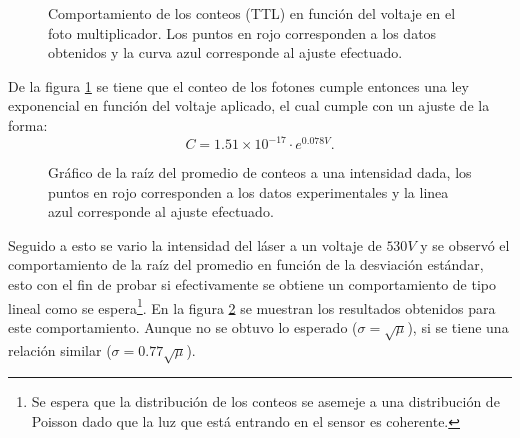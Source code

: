 \documentclass[%
 reprint,
 amsmath,amssymb,
 aps,
]{revtex4-1}
\begin{document}
{\begin{figure}[ht]
\caption{\label{fotomultiplicador}Comportamiento de los conteos (TTL) en función del voltaje en el foto multiplicador. Los puntos en rojo corresponden a los datos obtenidos y la curva azul corresponde al ajuste efectuado.}
\end{figure}

De la figura \ref{fotomultiplicador} se tiene que el conteo de los fotones cumple entonces una ley exponencial en función del voltaje aplicado, el cual cumple con un ajuste de la forma:
\begin{equation}
C=1.51\times10^{-17}\cdot e^{0.078V}.
\end{equation}

\begin{figure}[h]
\caption{\label{promedios_std} Gráfico de la raíz del promedio de conteos a una intensidad dada, los puntos en rojo corresponden a los datos experimentales y la linea azul corresponde al ajuste efectuado.}
\end{figure}

Seguido a esto se vario la intensidad del láser a un voltaje de $530 V$ y se observó el comportamiento de la raíz del promedio en función de la desviación estándar, esto con el fin de probar si efectivamente se obtiene un comportamiento de tipo lineal como se espera\footnote{Se espera que la distribución de los conteos se asemeje a una distribución de Poisson dado que la luz que está entrando en el sensor es coherente.}. En la figura \ref{promedios_std} se muestran los resultados obtenidos para este comportamiento. Aunque no se obtuvo lo esperado ($\sigma=\sqrt{\mu}$), si se tiene una relación similar ($\sigma=0.77\sqrt{\mu}$).


}
\end{document}
